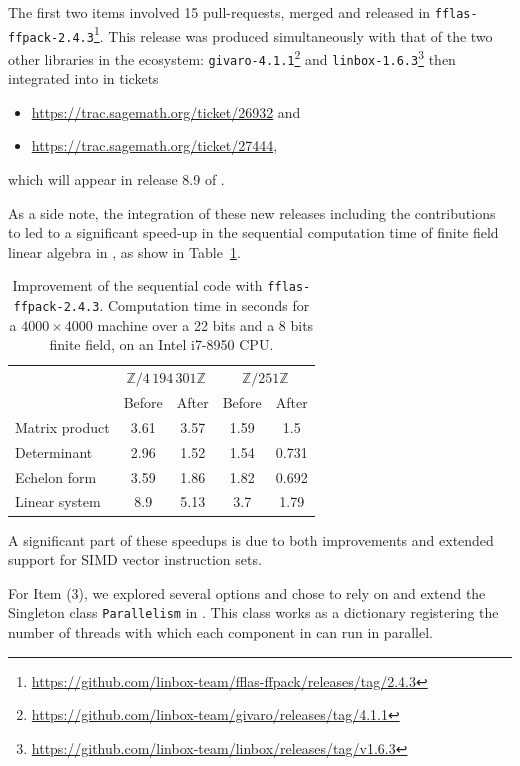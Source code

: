 \documentclass{deliverablereport}
\begin{document}
The first two items involved 15 pull-requests, merged and released in
\texttt{fflas-ffpack-2.4.3}\footnote{\url{https://github.com/linbox-team/fflas-ffpack/releases/tag/2.4.3}}. This release
was produced simultaneously with that of the two other libraries in the \Linbox
ecosystem: \texttt{givaro-4.1.1}\footnote{\url{https://github.com/linbox-team/givaro/releases/tag/4.1.1}} and
\texttt{linbox-1.6.3}\footnote{\url{https://github.com/linbox-team/linbox/releases/tag/v1.6.3}} then integrated into \SageMath
in tickets
\begin{itemize}
\item  \url{https://trac.sagemath.org/ticket/26932} and
\item  \url{https://trac.sagemath.org/ticket/27444},
\end{itemize}
which will appear in release 8.9 of \SageMath.

As a side note, the integration of these new releases including the contributions to  led
to a significant speed-up in the sequential computation time of finite field linear algebra in \SageMath, as show in
Table~\ref{tab:release}.
%
\begin{table}[htb]
  \begin{tabular}{lcccc}
    \toprule
&    \multicolumn{2}{c}{$\mathbb{Z}/4\,194\,301\mathbb{Z}$}&    \multicolumn{2}{c}{$\mathbb{Z}/251\mathbb{Z}$}\\
    & Before & After & Before & After\\
    \midrule
    Matrix product & 3.61& 3.57&1.59&1.5 \\
    Determinant &  2.96& 1.52 &1.54&0.731\\
    Echelon form & 3.59& 1.86 & 1.82& 0.692 \\
    Linear system & 8.9 & 5.13 & 3.7&1.79\\ 
    \bottomrule
  \end{tabular}
  \vspace{1em}
  
  \caption{Improvement of the sequential code with \texttt{fflas-ffpack-2.4.3}. Computation time in seconds for a
    $4000\times    4000$ machine over a 22 bits and a 8 bits finite field, on an Intel i7-8950 CPU.}
  \label{tab:release}
\end{table}
%
A significant part of these speedups is due to both improvements and extended support for SIMD vector
instruction sets.

For Item (3), we explored several options and chose to rely on and extend the Singleton class \texttt{Parallelism} in
\SageMath. This class works as a dictionary registering the number of threads with which each component in \SageMath can
run in parallel.
\end{document}
